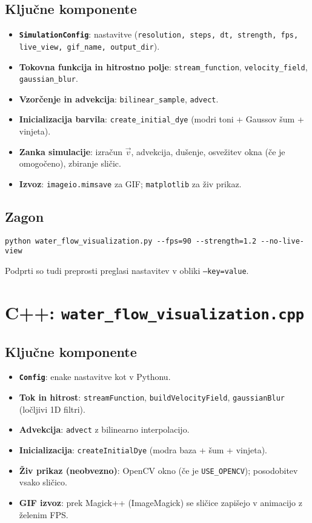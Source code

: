 \documentclass[11pt,a4paper]{article}
\begin{document}
\subsection*{Ključne komponente}
\begin{itemize}[noitemsep]
  \item \textbf{\texttt{SimulationConfig}}: nastavitve (\texttt{resolution, steps, dt, strength, fps, live\_view, gif\_name, output\_dir}).
  \item \textbf{Tokovna funkcija in hitrostno polje}: \texttt{stream\_function}, \texttt{velocity\_field}, \texttt{gaussian\_blur}.
  \item \textbf{Vzorčenje in advekcija}: \texttt{bilinear\_sample}, \texttt{advect}.
  \item \textbf{Inicializacija barvila}: \texttt{create\_initial\_dye} (modri toni + Gaussov šum + vinjeta).
  \item \textbf{Zanka simulacije}: izračun \(\vec v\), advekcija, dušenje, osvežitev okna (če je omogočeno), zbiranje sličic.
  \item \textbf{Izvoz}: \texttt{imageio.mimsave} za GIF; \texttt{matplotlib} za živ prikaz.
\end{itemize}

\subsection*{Zagon}
\begin{verbatim}
python water_flow_visualization.py --fps=90 --strength=1.2 --no-live-view
\end{verbatim}
Podprti so tudi preprosti preglasi nastavitev v obliki \texttt{--key=value}.

\section{C++: \texttt{water\_flow\_visualization.cpp}}
\subsection*{Ključne komponente}
\begin{itemize}[noitemsep]
  \item \textbf{\texttt{Config}}: enake nastavitve kot v Pythonu.
  \item \textbf{Tok in hitrost}: \texttt{streamFunction}, \texttt{buildVelocityField}, \texttt{gaussianBlur} (ločljivi 1D filtri).
  \item \textbf{Advekcija}: \texttt{advect} z bilinearno interpolacijo.
  \item \textbf{Inicializacija}: \texttt{createInitialDye} (modra baza + šum + vinjeta).
  \item \textbf{Živ prikaz (neobvezno)}: OpenCV okno (če je \texttt{USE\_OPENCV}); posodobitev vsako sličico.
  \item \textbf{GIF izvoz}: prek Magick++ (ImageMagick) se sličice zapišejo v animacijo z želenim FPS.
\end{itemize}
\end{document}
